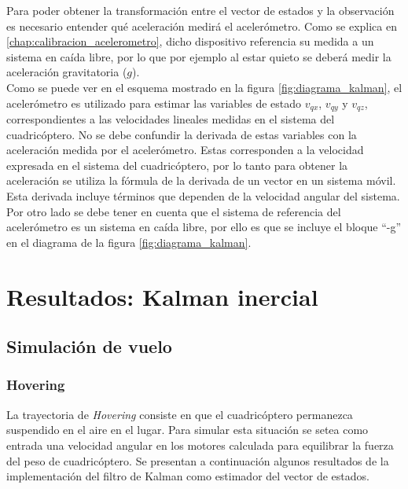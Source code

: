 \documentclass[main]{subfiles}
\begin{document}
Para poder obtener la transformación entre el vector de estados y la observación es necesario entender qué aceleración medirá el acelerómetro. Como se explica en \ref{chap:calibracion_acelerometro}, dicho dispositivo referencia su medida a un sistema en caída libre, por lo que por ejemplo al estar quieto se deberá medir la aceleración gravitatoria ($g$).\\
Como se puede ver en el esquema mostrado en la figura \ref{fig:diagrama_kalman}, el acelerómetro es utilizado para estimar las variables de estado $v_{qx}$, $v_{qy}$ y $v_{qz}$, correspondientes a las velocidades lineales medidas en el sistema del cuadricóptero. No se debe confundir la derivada de estas variables con la aceleración medida por el acelerómetro. Estas corresponden a la velocidad expresada en el sistema del cuadric\'optero, por lo tanto para obtener la aceleraci\'on se utiliza la f\'ormula de la derivada de un vector en un sistema m\'ovil. Esta derivada incluye t\'erminos que dependen de la velocidad angular del sistema.  Por otro lado se debe tener en cuenta que el sistema de referencia del acelerómetro es un sistema en caída libre, por ello es que se incluye el bloque ``-g'' en el diagrama de la figura \ref{fig:diagrama_kalman}.



\section{Resultados: Kalman inercial}

\subsection{Simulación de vuelo}
\subsubsection{Hovering}
La trayectoria de \emph{Hovering} consiste en que el cuadricóptero permanezca suspendido en el aire en el lugar. Para simular esta situación se setea como entrada una velocidad angular en los motores calculada para equilibrar la fuerza del peso de cuadricóptero.
Se presentan a continuación algunos resultados de la implementación del filtro de Kalman como estimador del vector de estados.\\
\end{document}
